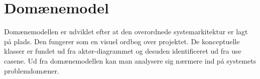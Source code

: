 \section{Domænemodel}
Domænemodellen er udviklet efter at den overordnede systemarkitektur er lagt på plads. Den fungerer som en visuel ordbog over projektet. De konceptuelle klasser er fundet ud fra aktør-diagrammet og desuden identificeret ud fra use casene. Ud fra domænemodellen kan man analysere sig nærmere ind på systemets problemdomæner.

